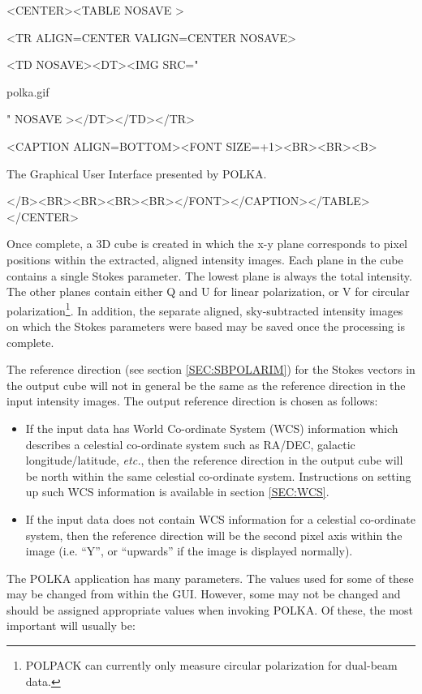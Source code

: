 \documentclass[twoside,11pt]{article}
\newcommand{\hyperref}[4]{#2\ref{#4}#3}
\renewcommand{\_}{\texttt{\symbol{95}}}
\newcommand{\htmlfig}[3]{
   \label{#1}
   \begin{rawhtml} <CENTER><TABLE NOSAVE > \end{rawhtml}
   \begin{rawhtml} <TR ALIGN=CENTER VALIGN=CENTER NOSAVE> \end{rawhtml}
   \begin{rawhtml} <TD NOSAVE><DT><IMG SRC=" \end{rawhtml}
   #2
   \begin{rawhtml} " NOSAVE ></DT></TD></TR> \end{rawhtml}
   \begin{rawhtml} <CAPTION ALIGN=BOTTOM><FONT SIZE=+1><BR><BR><B> \end{rawhtml}
   #3 
   \begin{rawhtml} </B><BR><BR><BR><BR></FONT></CAPTION></TABLE></CENTER> \end{rawhtml}
}
\begin{document}
\begin{htmlonly}
\htmlfig{fig:polka}{polka.gif}{
The Graphical User Interface presented by POLKA.}
\end{htmlonly}

Once complete, a 3D cube is created in which the x-y plane corresponds to
pixel positions within the extracted, aligned intensity images. Each
plane in the cube contains a single Stokes parameter. The lowest plane is
always the total intensity. The other planes contain either Q and U for
linear polarization, or V for circular polarization\footnote{POLPACK can
currently only measure circular polarization for dual-beam data.}. In
addition, the separate aligned, sky-subtracted intensity images on which
the Stokes parameters were based may be saved once the processing is
complete.

The reference direction (see \hyperref{this section}{section }
{}{SEC:SBPOLARIM}) for the Stokes vectors in the output cube will
not in general be the same as the reference direction in the input 
intensity images. The output reference direction is chosen as follows:

\begin{itemize}
\item If the input data has World Co-ordinate System (WCS) information
which describes a celestial co-ordinate system such as RA/DEC, galactic 
longitude/latitude, \emph{etc.}, then the reference direction in the output cube
will be north within the same celestial co-ordinate system.
Instructions on setting up such WCS information is available
\hyperref{here}{in section }{}{SEC:WCS}.

\item If the input data does not contain WCS information for a celestial
co-ordinate system, then the reference direction will be the second pixel
axis within the image (i.e. ``Y'', or ``upwards'' if the image is
displayed normally).
\end{itemize}

The POLKA application has many parameters. The values used for some of
these may be changed from within the GUI. However, some may not be
changed and should be assigned appropriate values when invoking POLKA.
Of these, the most important will usually be:
\end{document}
